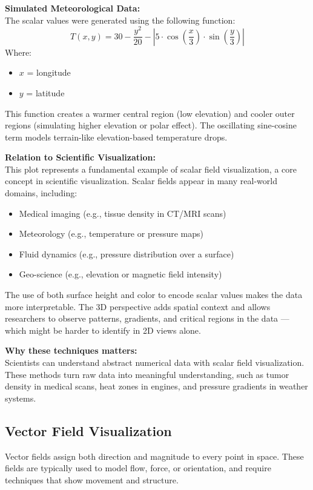 \documentclass[11pt]{article}
\begin{document}
\vspace{0.5em}
\noindent
\textbf{Simulated Meteorological Data:} \\
The scalar values were generated using the following function:
\[
	T(x, y) = 30 - \frac{y^2}{20} - \left|5 \cdot \cos\left(\frac{x}{3}\right) \cdot \sin\left(\frac{y}{3}\right)\right|
\]
Where:
\begin{itemize}
	\item $x$ = longitude
	\item $y$ = latitude
\end{itemize}
	
This function creates a warmer central region (low elevation) and cooler outer regions (simulating higher elevation or polar effect). The oscillating sine-cosine term models terrain-like elevation-based temperature drops.
	
\vspace{1em}
\noindent
\textbf{Relation to Scientific Visualization:} \\
This plot represents a fundamental example of scalar field visualization, a core concept in scientific visualization. Scalar fields appear in many real-world domains, including:
	
\begin{itemize}
	\item Medical imaging (e.g., tissue density in CT/MRI scans)
	\item Meteorology (e.g., temperature or pressure maps) 
	\item Fluid dynamics (e.g., pressure distribution over a surface)
	\item Geo-science (e.g., elevation or magnetic field intensity)
\end{itemize}
	
The use of both surface height and color to encode scalar values makes the data more interpretable. The 3D perspective adds spatial context and allows researchers to observe patterns, gradients, and critical regions in the data — which might be harder to identify in 2D views alone.
	
\vspace{1em}
\noindent
\textbf{Why these techniques matters:} \\
Scientists can understand abstract numerical data with scalar field visualization. These methods turn raw data into meaningful understanding, such as tumor density in medical scans, heat zones in engines, and pressure gradients in weather systems.
	

\subsection{Vector Field Visualization}
Vector fields assign both direction and magnitude to every point in space. These fields are typically used to model flow, force, or orientation, and require techniques that show movement and structure.
	
\end{document}
